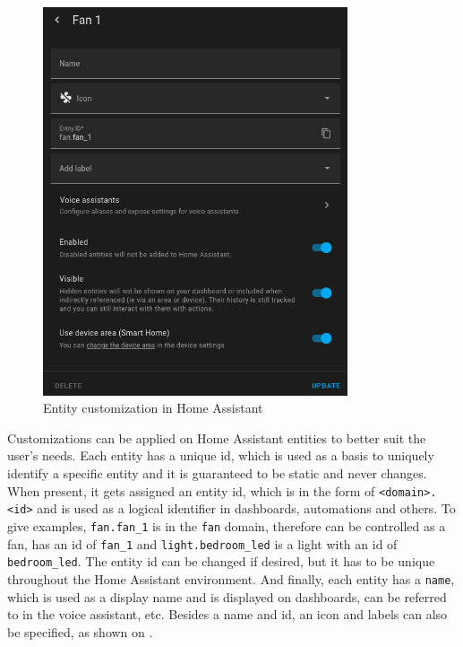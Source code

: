 \begin{figure}[!ht]
  \centering
  \includegraphics[width=90mm, keepaspectratio]{figures/homeassistant_entity_customization.png}
  \caption{Entity customization in Home Assistant}
  \label{fig:HAentityCustomization}
\end{figure}

Customizations can be applied on Home Assistant entities to better suit the user's needs. Each entity has a unique id, which is used as a basis to uniquely identify a specific entity and it is guaranteed to be static and never changes. \cite{HAFAQUniqueID} When present, it gets assigned an entity id, which is in the form of \verb+<domain>.<id>+ and is used as a logical identifier in dashboards, automations and others. \cite{HAEntitiesDomains} To give examples, \verb+fan.fan_1+ is in the \verb+fan+ domain, therefore can be controlled as a fan, has an id of \verb+fan_1+ and \verb+light.bedroom_led+ is a light with an id of \verb+bedroom_led+. The entity id can be changed if desired, but it has to be unique throughout the Home Assistant environment. And finally, each entity has a \verb+name+, which is used as a display name and is displayed on dashboards, can be referred to in the voice assistant, etc. Besides a name and id, an icon and labels can also be specified, as shown on .

